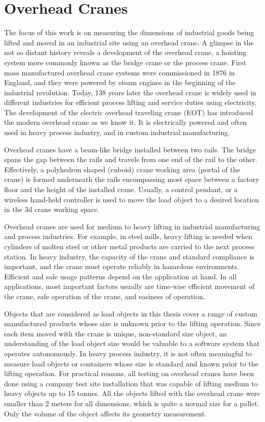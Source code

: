 \documentclass[12pt,a4paper,oneside,pdftex]{report}
\begin{document}
\section{Overhead Cranes}
\label{section:overhead_cranes}
The focus of this work is on measuring the dimensions of industrial goods being lifted and moved in an industrial site using an overhead crane. A glimpse in the not so distant history reveals a development of the overhead crane, a hoisting system more commonly known as the bridge crane or the process crane. First mass manufactured overhead crane systems were commissioned in 1876 in England, and they were powered by steam engines in the beginning of the industrial revolution. Today, 138 years later the overhead crane is widely used in different industries for efficient process lifting and service duties using electricity. The development of the electric overhead traveling crane (EOT) has introduced the modern overhead crane as we know it. It is electrically powered and often used in heavy process industry, and in custom industrial manufacturing.\par
    Overhead cranes have a beam-like bridge installed between two rails. The bridge spans the gap between the rails and travels from one end of the rail to the other. Effectively, a polyhedron shaped (cuboid) crane working area (portal of the crane) is formed underneath the rails encompassing most space between a factory floor and the height of the installed crane. Usually, a control pendant, or a wireless hand-held controller is used to move the load object to a desired location in the 3d crane working space. \par
    Overhead cranes are used for medium to heavy lifting in industrial manufacturing and process industries. For example, in steel mills, heavy lifting is needed when cylinders of molten steel or other metal products are carried to the next process station. In heavy industry, the capacity of the crane and standard compliance is important, and the crane must operate reliably in hazardous environments. Efficient and safe usage patterns depend on the application at hand. In all applications, most important factors usually are time-wise efficient movement of the crane, safe operation of the crane, and easiness of operation.\par
    Objects that are considered as load objects in this thesis cover a range of custom manufactured products whose size is unknown prior to the lifting operation. Since each item moved with the crane is unique, non-standard size object, an understanding of the load object size would be valuable to a software system that operates autonomously.
    In heavy process industry, it is not often meaningful to measure load objects or containers whose size is standard and known prior to the lifting operation. For practical reasons, all testing on overhead cranes have been done using a company test site installation that was capable of lifting medium to heavy objects up to 15 tonnes. All the objects lifted with the overhead crane were smaller than 2 meters for all dimensions, which is quite a normal size for a pallet. Only the volume of the object affects its geometry measurement.
\end{document}
